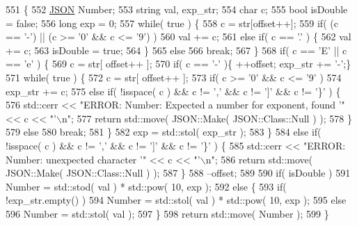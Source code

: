 \begin{DoxyCode}
551                                                            \{
552         \mbox{\hyperlink{class_j_s_o_n}{JSON}} Number;
553         \textcolor{keywordtype}{string} val, exp\_str;
554         \textcolor{keywordtype}{char} c;
555         \textcolor{keywordtype}{bool} isDouble = \textcolor{keyword}{false};
556         \textcolor{keywordtype}{long} exp = 0;
557         \textcolor{keywordflow}{while}( \textcolor{keyword}{true} ) \{
558             c = str[offset++];
559             \textcolor{keywordflow}{if}( (c == \textcolor{charliteral}{'-'}) || (c >= \textcolor{charliteral}{'0'} && c <= \textcolor{charliteral}{'9'}) )
560                 val += c;
561             \textcolor{keywordflow}{else} \textcolor{keywordflow}{if}( c == \textcolor{charliteral}{'.'} ) \{
562                 val += c; 
563                 isDouble = \textcolor{keyword}{true};
564             \}
565             \textcolor{keywordflow}{else}
566                 \textcolor{keywordflow}{break};
567         \}
568         \textcolor{keywordflow}{if}( c == \textcolor{charliteral}{'E'} || c == \textcolor{charliteral}{'e'} ) \{
569             c = str[ offset++ ];
570             \textcolor{keywordflow}{if}( c == \textcolor{charliteral}{'-'} )\{ ++offset; exp\_str += \textcolor{charliteral}{'-'};\}
571             \textcolor{keywordflow}{while}( \textcolor{keyword}{true} ) \{
572                 c = str[ offset++ ];
573                 \textcolor{keywordflow}{if}( c >= \textcolor{charliteral}{'0'} && c <= \textcolor{charliteral}{'9'} )
574                     exp\_str += c;
575                 \textcolor{keywordflow}{else} \textcolor{keywordflow}{if}( !isspace( c ) && c != \textcolor{charliteral}{','} && c != \textcolor{charliteral}{']'} && c != \textcolor{charliteral}{'\}'} ) \{
576                     std::cerr << \textcolor{stringliteral}{"ERROR: Number: Expected a number for exponent, found '"} << c << \textcolor{stringliteral}{"'\(\backslash\)n"};
577                     \textcolor{keywordflow}{return} std::move( JSON::Make( JSON::Class::Null ) );
578                 \}
579                 \textcolor{keywordflow}{else}
580                     \textcolor{keywordflow}{break};
581             \}
582             exp = std::stol( exp\_str );
583         \}
584         \textcolor{keywordflow}{else} \textcolor{keywordflow}{if}( !isspace( c ) && c != \textcolor{charliteral}{','} && c != \textcolor{charliteral}{']'} && c != \textcolor{charliteral}{'\}'} ) \{
585             std::cerr << \textcolor{stringliteral}{"ERROR: Number: unexpected character '"} << c << \textcolor{stringliteral}{"'\(\backslash\)n"};
586             \textcolor{keywordflow}{return} std::move( JSON::Make( JSON::Class::Null ) );
587         \}
588         --offset;
589         
590         \textcolor{keywordflow}{if}( isDouble )
591             Number = std::stod( val ) * std::pow( 10, exp );
592         \textcolor{keywordflow}{else} \{
593             \textcolor{keywordflow}{if}( !exp\_str.empty() )
594                 Number = std::stol( val ) * std::pow( 10, exp );
595             \textcolor{keywordflow}{else}
596                 Number = std::stol( val );
597         \}
598         \textcolor{keywordflow}{return} std::move( Number );
599     \}
\end{DoxyCode}
